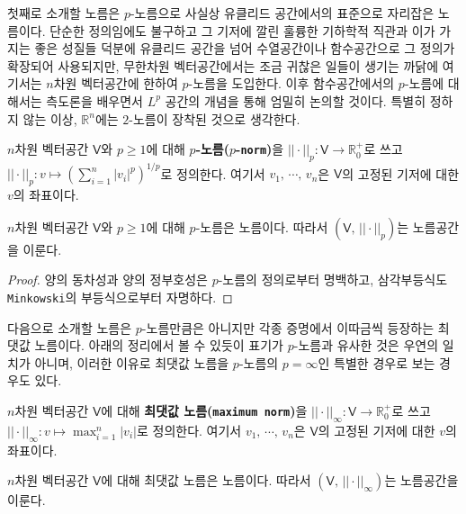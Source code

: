 첫째로 소개할 노름은 $p$-노름으로 사실상 유클리드 공간에서의 표준으로 자리잡은 노름이다. 단순한 정의임에도 불구하고 그 기저에 깔린 훌륭한 기하학적 직관과 이가 가지는 좋은 성질들 덕분에 유클리드 공간을 넘어 수열공간이나 함수공간으로 그 정의가 확장되어 사용되지만, 무한차원 벡터공간에서는 조금 귀찮은 일들이 생기는 까닭에 여기서는 $n$차원 벡터공간에 한하여 $p$-노름을 도입한다. 이후 함수공간에서의 $p$-노름에 대해서는 측도론을 배우면서 $L^p$ 공간의 개념을 통해 엄밀히 논의할 것이다. 특별히 정하지 않는 이상, $\mathbb{R}^n$에는 $2$-노름이 장착된 것으로 생각한다.

\begin{definition}
    $n$차원 벡터공간 $\mathsf{V}$와 $p\geq1$에 대해 \textbf{$p$-노름($p$-\texttt{norm})}을 $||\cdot||_p:\mathsf{V}\to\mathbb{R}_0^+$로 쓰고 $||\cdot||_p:v\mapsto(\sum_{i=1}^n|v_i|^p)^{1/p}$로 정의한다. 여기서 $v_1,\,\cdots,\,v_n$은 $\mathsf{V}$의 고정된 기저에 대한 $v$의 좌표이다.
\end{definition}

\begin{proposition}
    $n$차원 벡터공간 $\mathsf{V}$와 $p\geq1$에 대해 $p$-노름은 노름이다. 따라서 $(\mathsf{V},\,||\cdot||_p)$는 노름공간을 이룬다.
\end{proposition}

\begin{proof}
    양의 동차성과 양의 정부호성은 $p$-노름의 정의로부터 명백하고, 삼각부등식도 \texttt{Minkowski}의 부등식으로부터 자명하다.
\end{proof}

다음으로 소개할 노름은 $p$-노름만큼은 아니지만 각종 증명에서 이따금씩 등장하는 최댓값 노름이다. 아래의 정리에서 볼 수 있듯이 표기가 $p$-노름과 유사한 것은 우연의 일치가 아니며, 이러한 이유로 최댓값 노름을 $p$-노름의 $p=\infty$인 특별한 경우로 보는 경우도 있다.

\begin{definition}
    $n$차원 벡터공간 $\mathsf{V}$에 대해 \textbf{최댓값 노름(\texttt{maximum norm})}을 $||\cdot||_\infty:\mathsf{V}\to\mathbb{R}_0^+$로 쓰고 $||\cdot||_\infty:v\mapsto\max_{i=1}^n|v_i|$로 정의한다. 여기서 $v_1,\,\cdots,\,v_n$은 $\mathsf{V}$의 고정된 기저에 대한 $v$의 좌표이다.
\end{definition}

\begin{proposition}
    $n$차원 벡터공간 $\mathsf{V}$에 대해 최댓값 노름은 노름이다. 따라서 $(\mathsf{V},\,||\cdot||_\infty)$는 노름공간을 이룬다.
\end{proposition}

